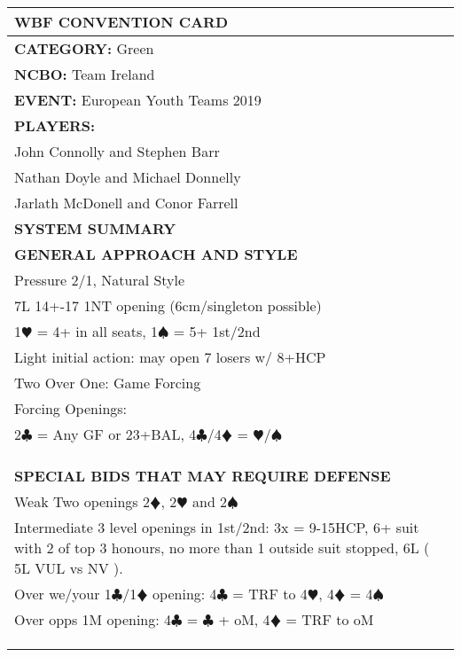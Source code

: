 \documentclass{article}
\newcommand\C{\ensuremath{\clubsuit}}
\newcommand\D{\color{red}\ensuremath{\vardiamondsuit}}
\renewcommand\H{\color{red}\ensuremath{\varheartsuit}}
\renewcommand\S{\ensuremath{\spadesuit}}
\newcommand\N{{\footnotesize NT}}
\begin{document}
\begin{minipage}{5mm}
	\begin{tabular}{| p{5mm} |}
	\end{tabular}
\end{minipage}
\begin{minipage}{90mm}
	\begin{tabular}{| p{88mm} |}
		\hline
		\cellcolor{green!25} \textbf{WBF CONVENTION CARD} \\ \hline
		\textbf{CATEGORY:} Green\\
		\textbf{NCBO:} Team Ireland \\
		\textbf{EVENT:} European Youth Teams 2019\\
		\textbf{PLAYERS:} \\
		John Connolly and Stephen Barr\\
		Nathan Doyle and Michael Donnelly\\ 
		Jarlath McDonell and Conor Farrell
		\multirow{2}{*}{} \\
		\hline \cellcolor{green!25} \textbf{SYSTEM SUMMARY} \\ \hline
		\cellcolor{orange!25}\textbf{GENERAL APPROACH AND STYLE} \\ \hline
		Pressure 2/1, Natural Style\\ \hline
		7L 14+-17 1{\N} opening (6cm/singleton possible)\\ \hline
		1{\H} = 4+ in all seats, 1{\S} = 5+ 1st/2nd\\ \hline
		Light initial action: may open 7 losers w/ 8+HCP\\ \hline
		Two Over One: Game Forcing\\ \hline
		Forcing Openings:\\ \hline
		{2\C} = Any GF or 23+BAL, 4{\C}/4{\D} = {\H}/{\S} \\ \hline
		\\ \hline
		\\ \hline
		\\ \hline
		\cellcolor{orange!25}\textbf{SPECIAL BIDS THAT MAY REQUIRE DEFENSE} \\ \hline
		Weak Two openings 2{\D}, 2{\H} and 2{\S}\\ \hline
		Intermediate 3 level openings in 1st/2nd: 
		3x = 9-15HCP, 6+ suit with 2 of top 3 honours,
		no more than 1 outside suit stopped, 6L ( 5L VUL vs NV ).\\ \hline
		Over we/your 1{\C}/1{\D} opening: 4{\C} = TRF to 4{\H}, 4{\D} = 4{\S} \\ \hline
		Over opps 1M opening: 4{\C} = {\C} + oM, 4{\D} = TRF to oM\\ \hline
		\\ \hline
		\\ \hline
		\\ \hline


\end{tabular}
\end{minipage}
\end{document}
